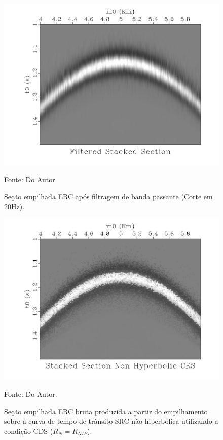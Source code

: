 \begin{figure}
\caption{Seção empilhada ERC após filtragem de banda passante (Corte em 20Hz).}
\begin{center}
\includegraphics[scale=0.4]{images/filteredStackedSection.jpeg}
\vspace{-0.3cm}
\end{center}
\begin{center}
 Fonte: Do Autor.
\end{center}
\label{fig:7.10}
\end{figure}

\begin{figure}
\caption{Seção empilhada ERC bruta produzida a partir do empilhamento sobre a curva de tempo de trânsito SRC não hiperbólica
utilizando a condição CDS ($R_N=R_{NIP}$).}
\begin{center}
\includegraphics[scale=0.4]{images/stackedSectionNcrs.jpeg}
\vspace{-0.3cm}
\end{center}
\begin{center}
 Fonte: Do Autor.
\end{center}
\label{fig:7.11}
\end{figure}

